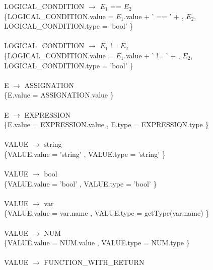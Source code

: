 \documentclass[10pt,a4paper]{article}
\begin{document}
{{{LOGICAL\_CONDITION $\rightarrow$ $E_{1}$ == $E_{2}$   \\

\{LOGICAL\_CONDITION.value = $E_{1}$.value + ' == ' +  , $E_{2}$,  LOGICAL\_CONDITION.type = 'bool' \}  \\ \\

LOGICAL\_CONDITION $\rightarrow$ $E_{1}$ != $E_{2}$ \\

\{LOGICAL\_CONDITION.value = $E_{1}$.value + ' != ' +  , $E_{2}$,  LOGICAL\_CONDITION.type = 'bool' \}  \\ \\


E $\rightarrow$ ASSIGNATION   \\

\{E.value = ASSIGNATION.value  \}  \\ \\

E $\rightarrow$ EXPRESSION \\

\{E.value = EXPRESSION.value  , E.type = EXPRESSION.type \}  \\ \\


VALUE $\rightarrow$ string   \\

\{VALUE.value =  'string' , VALUE.type = 'string' \}  \\ \\


VALUE $\rightarrow$ bool   \\

\{VALUE.value =  'bool' , VALUE.type = 'bool' \}  \\ \\


VALUE $\rightarrow$ var   \\

\{VALUE.value =  var.name , VALUE.type = getType(var.name) \}  \\ \\


VALUE $\rightarrow$ NUM   \\

\{VALUE.value =  NUM.value , VALUE.type = NUM.type \}  \\ \\


VALUE $\rightarrow$ FUNCTION\_WITH\_RETURN \\

}}}
\end{document}
